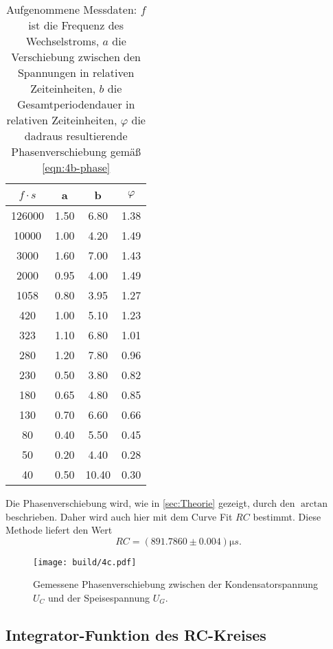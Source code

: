 \begin{table}
	\centering
	\caption{Aufgenommene Messdaten: $f$ ist die Frequenz des Wechselstroms, $a$ die 
	Verschiebung zwischen den Spannungen in relativen Zeiteinheiten, $b$ die
	Gesamtperiodendauer in relativen Zeiteinheiten, $\varphi$ die dadraus resultierende
	Phasenverschiebung gemäß \autoref{eqn:4b-phase}}
	\label{tab:messdaten-4c}
	\begin{tabular}{c c c c}
		\toprule
		$f \cdot \si{s}$ &  a & b & $\varphi$ \\
		\midrule
		126000	&  1.50  &	 6.80  &	1.38 \\
		 10000	&  1.00  &	 4.20  &	1.49 \\
		  3000	&  1.60  &	 7.00  &	1.43 \\
		  2000	&  0.95  &	 4.00  &	1.49 \\
		1058  	&  0.80  &	 3.95  &	1.27 \\
		   420	&  1.00  &	 5.10  &	1.23 \\
		   323	&  1.10  &	 6.80  &	1.01 \\
		   280	&  1.20  &	 7.80  &	0.96 \\
		   230	&  0.50  &	 3.80  &	0.82 \\
		   180	&  0.65  &	 4.80  &	0.85 \\
		   130	&  0.70  &	 6.60  &	0.66 \\
		    80	&  0.40  &	 5.50  &	0.45 \\
		    50	&  0.20  &	 4.40  &	0.28 \\
		    40	&  0.50  &	10.40  &	0.30 \\
		\bottomrule
	\end{tabular}
\end{table}

Die Phasenverschiebung wird, wie in \autoref{sec:Theorie} gezeigt, durch den $\arctan$ beschrieben.
Daher wird auch hier mit dem Curve Fit $RC$ bestimmt. Diese Methode liefert den Wert
\begin{equation}
	RC = (891.7860 \pm 0.004) \si{\micro s}.
	\label{eqn:ergebniss-4c}
\end{equation}

\begin{figure}[H]
	\centering
	\texttt{[image: build/4c.pdf]}
	\caption{Gemessene Phasenverschiebung zwischen der Kondensatorspannung $U_C$ und der Speisespannung
	$U_G$.}
	\label{fig:4c.pdf}
\end{figure}



\newpage

\subsection{Integrator-Funktion des RC-Kreises}
\label{sec:4d-auswertung}


